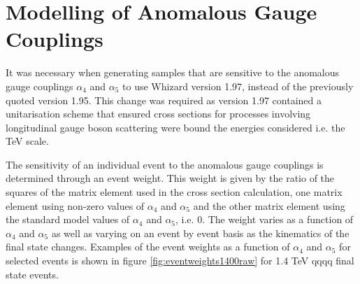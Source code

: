 \section{Modelling of Anomalous Gauge Couplings}
\label{sec:modellingofanomalouscouplings}
It was necessary when generating samples that are sensitive to the anomalous gauge couplings $\alpha_{4}$ and $\alpha_{5}$ to use Whizard version 1.97, instead of the previously quoted version 1.95.  This change was required as version 1.97 contained a unitarisation scheme that ensured cross sections for processes involving longitudinal gauge boson scattering were bound the energies considered i.e. the TeV scale.  

The sensitivity of an individual event to the anomalous gauge couplings is determined through an event weight. This weight is given by the ratio of the squares of the matrix element used in the cross section calculation, one matrix element using non-zero values of $\alpha_{4}$ and $\alpha_{5}$ and the other matrix element using the standard model values of $\alpha_{4}$ and $\alpha_{5}$, i.e. 0.  The weight varies as a function of $\alpha_{4}$ and $\alpha_{5}$ as well as varying on an event by event basis as the kinematics of the final state changes.  Examples of the event weights as a function of $\alpha_{4}$ and $\alpha_{5}$ for selected events is shown in figure \ref{fig:eventweights1400raw} for 1.4 TeV \nu{\nu}qqqq final state events.

